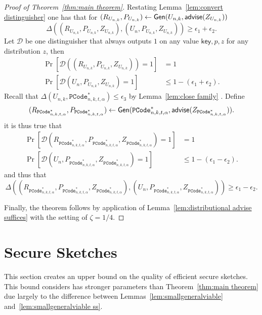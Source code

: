 \begin{proof}[Proof of Theorem~\ref{thm:main theorem}]
Restating Lemma~\ref{lem:convert distinguisher} one has that for $(R_{U_{n,k}},P_{U_{n,k}}) \leftarrow {\ensuremath{\mathsf{Gen}}}(U_{n,k}, {\mathsf{advise}}(Z_{U_{n,k}}))$
\[
\Delta((R_{U_{n,k}}, P_{U_{n,k}}, Z_{U_{n,k}}), (U_n, P_{U_{n,k}}, Z_{U_{n,k}}))\ge \epsilon_1+\epsilon_2.
\]
Let $\mathcal{D}$ be one distinguisher that always outputs $1$ on any value $\mathsf{key}, p, z$ for any distribution $z$, then
\begin{align*}
\Pr[\mathcal{D}((R_{U_{n,k}}, P_{U_{n,k}}, Z_{U_{n,k}}))=1] &=1\\
\Pr[\mathcal{D}(U_n, P_{U_{n,k}}, Z_{U_{n,k}})=1]&\le 1-(\epsilon_1+\epsilon_2).
\end{align*}
Recall that $\Delta(U_{n,k}, \mathtt{PCode}_{n, k, t, \alpha}^{*}) \le \epsilon_3$ by Lemma~\ref{lem:close family} .  Define \[(R_{\mathtt{PCode}_{n, k, t, \alpha}^{*}}, P_{\mathtt{PCode}_{n, k, t, \alpha}^{*}})\leftarrow {\ensuremath{\mathsf{Gen}}}(\mathtt{PCode}_{n, k, t, \alpha}^{*}, {\mathsf{advise}}(Z_{\mathtt{PCode}_{n, k, t, \alpha}^{*}})).\]
it is thus true that 
\begin{align*}
\Pr[\mathcal{D}(R_{\mathtt{PCode}_{n, k, t, \alpha}^{*}}, P_{\mathtt{PCode}_{n, k, t, \alpha}^{*}}, Z_{\mathtt{PCode}_{n, k, t, \alpha}^{*}})=1]&=1\\
\Pr[\mathcal{D}(U_n, P_{\mathtt{PCode}_{n, k, t, \alpha}^{*}}, Z_{\mathtt{PCode}_{n, k, t, \alpha}^{*}})=1]&\le 1-(\epsilon_1-\epsilon_2).
\end{align*}
and thus that 
\[
\Delta((R_{\mathtt{PCode}_{n, k, t, \alpha}^{*}}, P_{\mathtt{PCode}_{n, k, t, \alpha}^{*}}, Z_{\mathtt{PCode}_{n, k, t, \alpha}^{*}}), (U_n, P_{\mathtt{PCode}_{n, k, t, \alpha}^{*}}, Z_{\mathtt{PCode}_{n, k, t, \alpha}^{*}}))\ge \epsilon_1-\epsilon_2.
\]

\noindent
Finally, the theorem follows by application of Lemma~\ref{lem:distributional advise suffices} with the setting of $\zeta = 1/4$.
\end{proof} 

\section{Secure Sketches}
\label{sec:ss}
This section creates an upper bound on the quality of efficient secure sketches.  This bound considers has stronger parameters than Theorem~\ref{thm:main theorem} due largely to the difference between Lemmas~\ref{lem:smallgeneralviable} and~\ref{lem:smallgeneralviable ss}.

